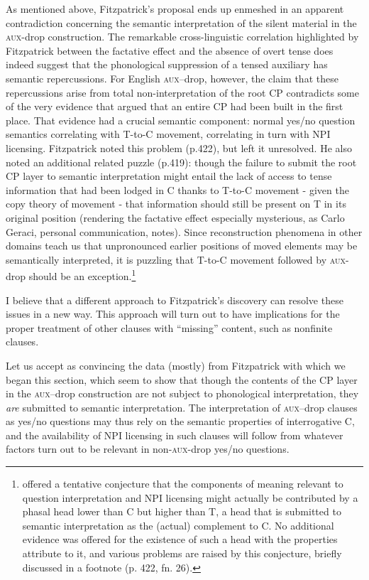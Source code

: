 \documentclass[output=paper]{langscibook}
\begin{document}
As mentioned above, Fitzpatrick's proposal ends up enmeshed in an apparent contradiction concerning the semantic interpretation of the silent material in the \textsc{aux-}drop construction. The remarkable cross-linguistic correlation highlighted by Fitzpatrick between the factative effect and the absence of overt tense does indeed suggest that the phonological suppression of a tensed auxiliary has semantic repercussions. For English \textsc{aux}--drop, however, the claim that these repercussions arise from total non-interpretation of the root CP contradicts some of the very evidence that argued that an entire CP had been built in the first place. That evidence had a crucial semantic component: normal yes/no question semantics correlating with T-to-C movement, correlating in turn with NPI licensing. Fitzpatrick noted this problem (p.422), but left it unresolved. He also noted an additional related puzzle (p.419): though the failure to submit the root CP layer to semantic interpretation might entail the lack of access to tense information that had been lodged in C thanks to T-to-C movement - given the copy theory of movement - that information should still be present on T in its original position (rendering the factative effect especially mysterious, as Carlo Geraci, personal communication, notes). Since reconstruction phenomena in other domains teach us that unpronounced earlier positions of moved elements may be semantically interpreted, it is puzzling that T-to-C movement followed by \textsc{aux-}drop should be an exception.\footnote{\noindent \citet{fitzpatrick2006deletion} offered a tentative conjecture that the components of meaning relevant to question interpretation and NPI licensing might actually be contributed by a phasal head lower than C but higher than T, a head that is submitted to semantic interpretation as the (actual) complement to C. No additional evidence was offered for the existence of such a head with the properties attribute to it, and various problems are raised by this conjecture, briefly discussed in a footnote (p. 422, fn. 26).}

I believe that a different approach to Fitzpatrick's discovery can resolve these issues in a new way. This approach will turn out to have implications for the proper treatment of other clauses with “missing” content, such as nonfinite clauses.

Let us accept as convincing the data (mostly) from Fitzpatrick with which we began this section, which seem to show that though the contents of the CP layer in the \textsc{aux}--drop construction are not subject to phonological interpretation, they \textit{are} submitted to semantic interpretation. The interpretation of \textsc{aux}--drop clauses as yes/no questions may thus rely on the semantic properties of interrogative C, and the availability of NPI licensing in such clauses will follow from whatever factors turn out to be relevant in non-\textsc{aux-}drop yes/no questions.
\end{document}
